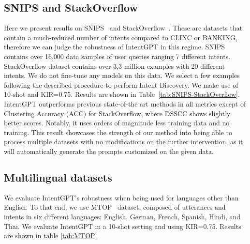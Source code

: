\documentclass[11pt]{article}
\begin{document}
\subsection{SNIPS and StackOverflow}
Here we present results on SNIPS~\cite{coucke2018snips} and StackOverflow~\cite{xu2015short}. These are datasets that contain a much-reduced number of intents compared to CLINC or BANKING, therefore we can judge the robustness of IntentGPT in this regime. SNIPS contains over 16,000 data samples of user queries ranging 7 different intents. StackOverflow dataset contains over 3,3 million examples with 20 different intents. We do not fine-tune any models on this data. We select a few examples following the described procedure to perform Intent Discovery. We make use of 10-shot and KIR=0.75. Results are shown in Table~\ref{tab:SNIPS-StackOverflow}. IntentGPT outperforms previous state-of-the art methods in all metrics except of Clustering Accuracy (ACC) for StackOverflow, where DSSCC shows slightly better scores. Notably, it uses orders of magnitude less training data and no training. This result showcases the strength of our method into being able to process multiple datasets with no modifications on the further intervention, as it will automatically generate the prompts customized on the given data.

\subsection{Multilingual datasets}\label{multilingual}
We evaluate IntentGPT's robustness when being used for languages other than English. To that end, we use MTOP~\cite{li2020mtop} dataset, composed of utterances and intents in six different languages: English, German, French, Spanish, Hindi, and Thai. We evaluate IntentGPT in a 10-shot setting and using KIR=0.75. Results are shown in table \ref{tab:MTOP}
\end{document}
